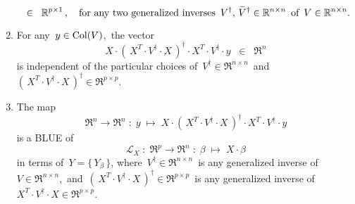 \begin{theorem}
\begin{enumerate}
\begin{equation*}
	\;\; \in \;\; \Re^{p \times 1}\,,
	\quad
	\textnormal{for any two generalized inverses
	\,$V^{\dagger},\, \widetilde{V}^{\dagger} \in \Re^{n \times n}$\,
	of \,$V \in \Re^{n \times n}$}.
	\end{equation*}	
\item\label{XXtVdaggerXXtVdaggerY}
	For any \,$y \in \Col(V)$,\, the vector
	\begin{equation*}
	X \cdot \left(\,X^{T} \cdot V^{\dagger} \cdot X\,\right)^{\dagger} \cdot X^{T} \cdot V^{\dagger} \cdot y \;\; \in \;\; \Re^{n}
	\end{equation*}
	is independent of the particular choices of
	\,$V^{\dagger} \in \Re^{n \times n}$\,
	and
	\,$\left(\,X^{T} \cdot V^{\dagger} \cdot X\,\right)^{\dagger} \in \Re^{p \times p}$.
\item\label{formulaColXsubsetColV}
	{\color{red}The map
	\begin{equation*}
	\Re^{n} \longrightarrow \Re^{n}
	\; : \; y \; \longmapsto \;
	X \cdot \left(\,X^{T} \cdot V^{\dagger} \cdot X\,\right)^{\dagger} \cdot X^{T} \cdot V^{\dagger} \cdot y
	\end{equation*}
	is a BLUE of
	\begin{equation*}
	\mathcal{L}_{X} \; : \; \Re^{p} \longrightarrow \Re^{n} \; : \; \beta \; \longmapsto \; X \cdot \beta
	\end{equation*}
	in terms of
	\,$Y = \{\,Y_{\beta}\,\}$},
	where
	\,$V^{\dagger} \in \Re^{n \times n}$\, is any generalized inverse of \,$V \in \Re^{n \times n}$,\,
	and
	\,$\left(\,X^{T} \cdot V^{\dagger} \cdot X\,\right)^{\dagger} \in \Re^{p \times p}$\,
	is any generalized inverse of
	\,$X^{T} \cdot V^{\dagger} \cdot X \in \Re^{p \times p}$.

\end{enumerate}
\end{theorem}
